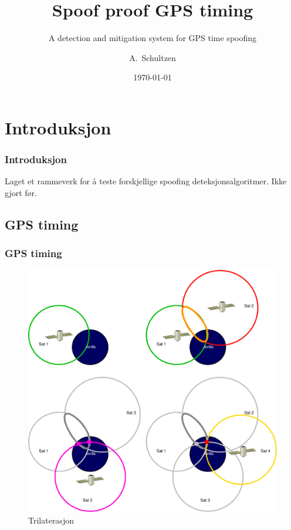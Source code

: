 \documentclass[xcolor=table]{beamer}
\title[Spoof proof GPS timing] %
{Spoof proof GPS timing}
\subtitle{A detection and mitigation system for GPS time spoofing}
\author[A. Schultzen] %
{A.~Schultzen\inst{1}}
\institute[Universities Here and There] %
{
  \inst{1}%
  Institutt for informatikk\\
  Universitetet i Oslo
}
\date{\today}
\begin{document}
\frame{\titlepage}

\section{Introduksjon}
  \frametitle{Introduksjon}
\begin{frame}
  Laget et rammeverk for å teste forskjellige spoofing deteksjonsalgoritmer. Ikke gjort før.
\end{frame}

\subsection{GPS timing}
\begin{frame}
\frametitle{GPS timing}
  \begin{figure}
  \vspace{-30pt}
      \includegraphics[scale=0.17]{thesis/graphics/trilaterate.pdf}
      \caption{Trilaterasjon}
    \end{figure}
\end{frame}
\end{document}
